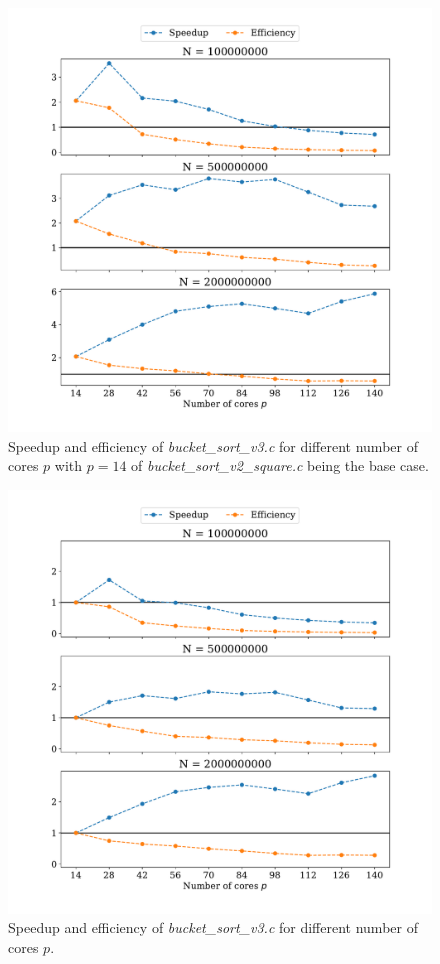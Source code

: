 \documentclass[a4paper, 11pt]{article}
\begin{document}
\begin{figure}
  \centering
  \includegraphics[width=\textwidth]{../part_2/plot/v3_speedup.pdf}
  \caption{Speedup and efficiency of \textit{bucket\_sort\_v3.c} for different
  number of cores $p$ with $p=14$ of \textit{bucket\_sort\_v2\_square.c} being
  the base case.}
  \label{fig:p2_v3_speedup}
\end{figure}
\begin{figure}
  \centering
  \includegraphics[width=\textwidth]{../part_2/plot/v3_speedup_v3_base.pdf}
  \caption{Speedup and efficiency of \textit{bucket\_sort\_v3.c} for different
  number of cores $p$.}
  \label{fig:p2_v3_speedup_v3_base}
\end{figure}
\end{document}
